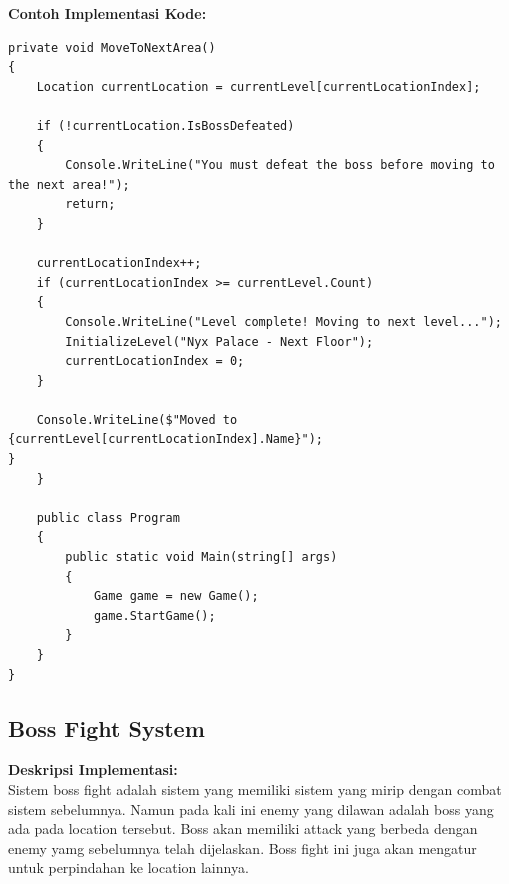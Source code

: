 \documentclass[12pt]{article}
\begin{document}
\textbf{Contoh Implementasi Kode:}
\begin{lstlisting}[language=CSharp, caption=Contoh Implementasi Area Movement System]
private void MoveToNextArea()
{
    Location currentLocation = currentLevel[currentLocationIndex];
    
    if (!currentLocation.IsBossDefeated)
    {
        Console.WriteLine("You must defeat the boss before moving to the next area!");
        return;
    }

    currentLocationIndex++;
    if (currentLocationIndex >= currentLevel.Count)
    {
        Console.WriteLine("Level complete! Moving to next level...");
        InitializeLevel("Nyx Palace - Next Floor");
        currentLocationIndex = 0;
    }

    Console.WriteLine($"Moved to {currentLevel[currentLocationIndex].Name}");
}
    }

    public class Program
    {
        public static void Main(string[] args)
        {
            Game game = new Game();
            game.StartGame();
        }
    }
}
\end{lstlisting}

\subsection{Boss Fight System}
\textbf{Deskripsi Implementasi:} \\
Sistem boss fight adalah sistem yang memiliki sistem yang mirip dengan combat sistem sebelumnya. Namun pada kali ini enemy yang dilawan adalah boss yang ada pada location tersebut. Boss akan memiliki attack yang berbeda dengan enemy yamg sebelumnya telah dijelaskan. Boss fight ini juga akan mengatur untuk perpindahan ke location lainnya.
\end{document}
